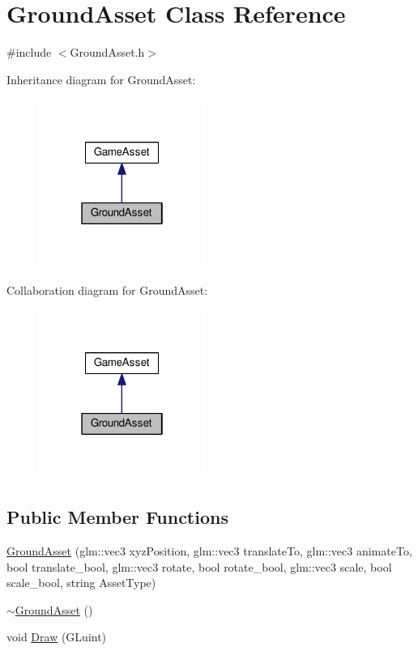 \hypertarget{class_ground_asset}{}\section{Ground\+Asset Class Reference}
\label{class_ground_asset}


{\ttfamily \#include $<$Ground\+Asset.\+h$>$}



Inheritance diagram for Ground\+Asset\+:\nopagebreak
\begin{figure}[H]
\begin{center}
\leavevmode
\includegraphics[width=154pt]{class_ground_asset__inherit__graph}
\end{center}
\end{figure}


Collaboration diagram for Ground\+Asset\+:\nopagebreak
\begin{figure}[H]
\begin{center}
\leavevmode
\includegraphics[width=154pt]{class_ground_asset__coll__graph}
\end{center}
\end{figure}
\subsection*{Public Member Functions}
\begin{DoxyCompactItemize}
\item 
\hyperlink{class_ground_asset_a67002eb5df923fab9293c5f43ed140a4}{Ground\+Asset} (glm\+::vec3 xyz\+Position, glm\+::vec3 translate\+To, glm\+::vec3 animate\+To, bool translate\+\_\+bool, glm\+::vec3 rotate, bool rotate\+\_\+bool, glm\+::vec3 scale, bool scale\+\_\+bool, string Asset\+Type)
\item 
\hyperlink{class_ground_asset_a8f607f3cabded6280c5a5eb2cbfa8c79}{$\sim$\+Ground\+Asset} ()
\item 
void \hyperlink{class_ground_asset_a440f983638c7a7ccb6a39718444dfe95}{Draw} (G\+Luint)
\end{DoxyCompactItemize}



